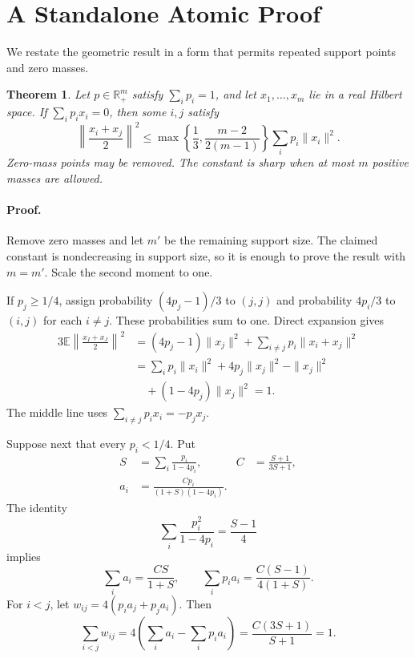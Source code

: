 \documentclass[twoside]{article}
\newtheorem{theorem}{Theorem}
\newcommand{\R}{\mathbb R}
\newcommand{\E}{\mathbb E}
\begin{document}
\runningauthor{}


\appendix

\section{A Standalone Atomic Proof}\label{app:atomic}

We restate the geometric result in a form that permits repeated support
points and zero masses.

\begin{theorem}\label{thm:app-atomic}
Let $p\in\R^m_+$ satisfy $\sum_i p_i=1$, and let $x_1,\ldots,x_m$ lie in a
real Hilbert space. If $\sum_i p_i x_i=0$, then some $i,j$ satisfy
\[
 \left\|\frac{x_i+x_j}{2}\right\|^2
 \leq
 \max\left\{\frac13,\frac{m-2}{2(m-1)}\right\}
 \sum_i p_i\|x_i\|^2.
\]
Zero-mass points may be removed. The constant is sharp when at most $m$
positive masses are allowed.
\end{theorem}

\paragraph{Proof.}
Remove zero masses and let $m'$ be the remaining support size. The claimed
constant is nondecreasing in support size, so it is enough to prove the result
with $m=m'$. Scale the second moment to one.

If $p_j\geq1/4$, assign probability $(4p_j-1)/3$ to $(j,j)$ and probability
$4p_i/3$ to $(i,j)$ for each $i\ne j$. These probabilities sum to one. Direct
expansion gives
\begin{align*}
 3\E\left\|\frac{x_I+x_J}{2}\right\|^2
 &=(4p_j-1)\|x_j\|^2
   +\sum_{i\ne j}p_i\|x_i+x_j\|^2\\
 &=\sum_i p_i\|x_i\|^2
   +4p_j\|x_j\|^2-\|x_j\|^2\\
 &\quad +(1-4p_j)\|x_j\|^2=1.
\end{align*}
The middle line uses $\sum_{i\ne j}p_i x_i=-p_jx_j$.

Suppose next that every $p_i<1/4$. Put
\begin{align*}
 S&=\sum_i\frac{p_i}{1-4p_i},
 &C&=\frac{S+1}{3S+1},\\
 a_i&=\frac{Cp_i}{(1+S)(1-4p_i)}.
\end{align*}
The identity
\[
 \sum_i\frac{p_i^2}{1-4p_i}=\frac{S-1}{4}
\]
implies
\[
 \sum_i a_i=\frac{CS}{1+S},
 \qquad
 \sum_i p_i a_i=\frac{C(S-1)}{4(1+S)}.
\]
For $i<j$, let $w_{ij}=4(p_i a_j+p_j a_i)$. Then
\[
 \sum_{i<j}w_{ij}
 =4\left(\sum_i a_i-\sum_i p_i a_i\right)
 =\frac{C(3S+1)}{S+1}=1.
\]
\end{document}
